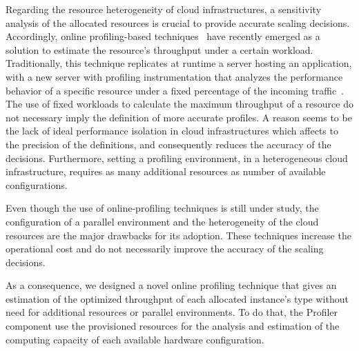Regarding the resource heterogeneity of cloud infrastructures, a sensitivity analysis of the allocated resources is crucial to provide accurate scaling decisions. Accordingly, online profiling-based techniques~\cite{kaviani_profiling-as--service:_2011} have recently emerged as a solution to  estimate the resource's throughput under a certain workload. Traditionally, this technique replicates at runtime a server hosting an application, with a new server with profiling instrumentation that analyzes the performance behavior of a specific resource under a fixed percentage of the incoming traffic~\cite{jiangThesis,dejavu2012}. The use of fixed workloads to calculate the maximum throughput of a resource do not necessary imply the definition of more accurate profiles. A reason seems to be the lack of ideal performance isolation in cloud infrastructures which affects to the precision of the definitions, and consequently reduces the accuracy of the decisions. Furthermore, setting a profiling environment, in a heterogeneous cloud infrastructure, requires as many additional resources as number of available configurations. 

Even though the use of online-profiling techniques is still under study, the configuration of a parallel environment and the heterogeneity of the cloud resources are the major drawbacks for its adoption. These techniques increase the operational cost and do not necessarily improve the accuracy of the scaling decisions.


As a consequence, we designed a novel online profiling technique that gives an estimation of the optimized throughput of each allocated instance's type without need for additional resources or parallel environments. To do that, the Profiler component use the provisioned resources for the analysis and estimation of the computing capacity of each available hardware configuration.

